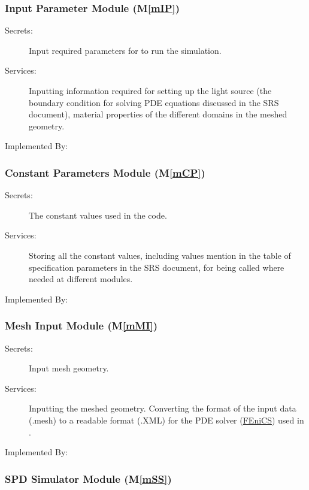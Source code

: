 \documentclass[12pt, titlepage]{article}
\newcommand{\mref}[1]{M\ref{#1}}
\begin{document}
	
	\subsubsection{Input Parameter Module (\mref{mIP})}
	
	\begin{description} \item[Secrets:]Input required parameters for \progname{} to
		run the simulation. \item[Services:]Inputting information required for setting
		up the light source (the boundary condition for solving PDE equations discussed
		in the SRS document), material properties of the different domains in the meshed
		geometry. \item[Implemented By:] \progname{} \end{description}
	
	
	\subsubsection{Constant Parameters Module (\mref{mCP})}
	
	\begin{description} \item[Secrets:] The constant values used in the code.
		\item[Services:] Storing all the constant values, including values mention in
		the table of specification parameters in the SRS document, for being called
		where needed at different modules. \item[Implemented By:] \progname{}
	\end{description}
	
	\subsubsection{Mesh Input Module (\mref{mMI})}
	
	\begin{description} \item[Secrets:]Input mesh geometry.
		\item[Services:]Inputting the meshed geometry. Converting the format of the
		input data (.mesh) to a readable format (.XML) for the PDE solver
		(\hyperref{https://fenicsproject.org/}{}{}{FEniCS}) used in \progname{}.
		\item[Implemented By:] \progname{} \end{description}
	
	\subsubsection{SPD Simulator Module (\mref{mSS})}
	
\end{document}
